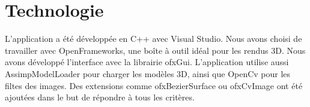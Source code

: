 \chapter{Technologie}
\label{s:technologie}

L’application a été développée en C++ avec Visual Studio. Nous avons choisi de travailler avec OpenFrameworks, une boîte à outil idéal pour les rendus 3D. Nous avons développé l’interface avec la librairie ofxGui. L'application utilise aussi AssimpModelLoader pour charger les modèles 3D, ainsi que OpenCv pour les filtes des images. Des extensions comme ofxBezierSurface ou ofxCvImage ont été ajoutées dans le but de répondre à tous les critères.\\